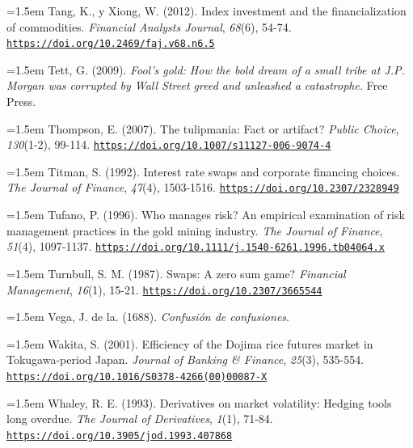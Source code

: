\documentclass[10pt,a4paper]{article}
\begin{document}
\noindent\hangindent=1.5em Tang, K., y Xiong, W. (2012). Index investment and the financialization of commodities. \textit{Financial Analysts Journal}, \textit{68}(6), 54-74. \href{https://doi.org/10.2469/faj.v68.n6.5}{\nolinkurl{https://doi.org/10.2469/faj.v68.n6.5}}

\noindent\hangindent=1.5em Tett, G. (2009). \textit{Fool's gold: How the bold dream of a small tribe at J.P. Morgan was corrupted by Wall Street greed and unleashed a catastrophe}. Free Press.

\noindent\hangindent=1.5em Thompson, E. (2007). The tulipmania: Fact or artifact? \textit{Public Choice}, \textit{130}(1-2), 99-114. \href{https://doi.org/10.1007/s11127-006-9074-4}{\nolinkurl{https://doi.org/10.1007/s11127-006-9074-4}}

\noindent\hangindent=1.5em Titman, S. (1992). Interest rate swaps and corporate financing choices. \textit{The Journal of Finance}, \textit{47}(4), 1503-1516. \href{https://doi.org/10.2307/2328949}{\nolinkurl{https://doi.org/10.2307/2328949}}

\noindent\hangindent=1.5em Tufano, P. (1996). Who manages risk? An empirical examination of risk management practices in the gold mining industry. \textit{The Journal of Finance}, \textit{51}(4), 1097-1137. \href{https://doi.org/10.1111/j.1540-6261.1996.tb04064.x}{\nolinkurl{https://doi.org/10.1111/j.1540-6261.1996.tb04064.x}}

\noindent\hangindent=1.5em Turnbull, S. M. (1987). Swaps: A zero sum game? \textit{Financial Management}, \textit{16}(1), 15-21. \href{https://doi.org/10.2307/3665544}{\nolinkurl{https://doi.org/10.2307/3665544}}

\noindent\hangindent=1.5em Vega, J. de la. (1688). \textit{Confusión de confusiones}.

\noindent\hangindent=1.5em Wakita, S. (2001). Efficiency of the Dojima rice futures market in Tokugawa-period Japan. \textit{Journal of Banking \& Finance}, \textit{25}(3), 535-554. \href{https://doi.org/10.1016/S0378-4266(00)00087-X}{\nolinkurl{https://doi.org/10.1016/S0378-4266(00)00087-X}}

\noindent\hangindent=1.5em Whaley, R. E. (1993). Derivatives on market volatility: Hedging tools long overdue. \textit{The Journal of Derivatives}, \textit{1}(1), 71-84. \href{https://doi.org/10.3905/jod.1993.407868}{\nolinkurl{https://doi.org/10.3905/jod.1993.407868}}
\end{document}
